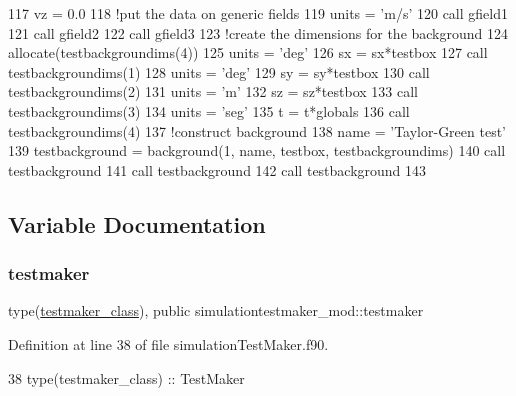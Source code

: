 \begin{DoxyCode}
117     vz = 0.0
118     \textcolor{comment}{!put the data on generic fields}
119     units = \textcolor{stringliteral}{'m/s'}
120     \textcolor{keyword}{call }gfield1%
121     \textcolor{keyword}{call }gfield2%
122     \textcolor{keyword}{call }gfield3%
123     \textcolor{comment}{!create the dimensions for the background}
124     \textcolor{keyword}{allocate}(testbackgroundims(4))
125     units = \textcolor{stringliteral}{'deg'}
126     sx = sx*testbox%
127     \textcolor{keyword}{call }testbackgroundims(1)%
128     units = \textcolor{stringliteral}{'deg'}
129     sy = sy*testbox%
130     \textcolor{keyword}{call }testbackgroundims(2)%
131     units = \textcolor{stringliteral}{'m'}
132     sz = sz*testbox%
133     \textcolor{keyword}{call }testbackgroundims(3)%
134     units = \textcolor{stringliteral}{'seg'}
135     t = t*globals%
136     \textcolor{keyword}{call }testbackgroundims(4)%
137     \textcolor{comment}{!construct background}
138     name = \textcolor{stringliteral}{'Taylor-Green test'}
139     testbackground = background(1, name, testbox, testbackgroundims)
140     \textcolor{keyword}{call }testbackground%
141     \textcolor{keyword}{call }testbackground%
142     \textcolor{keyword}{call }testbackground%
143 
\end{DoxyCode}


\subsection{Variable Documentation}
\mbox{\label{namespacesimulationtestmaker__mod_a344a43a231fc0e61e77875fa7ec95b12}} 
\subsubsection{\texorpdfstring{testmaker}{testmaker}}
{\footnotesize\ttfamily type(\mbox{\hyperlink{structsimulationtestmaker__mod_1_1testmaker__class}{testmaker\+\_\+class}}), public simulationtestmaker\+\_\+mod\+::testmaker}



Definition at line 38 of file simulation\+Test\+Maker.\+f90.


\begin{DoxyCode}
38     \textcolor{keywordtype}{type}(testmaker\_class) :: TestMaker
\end{DoxyCode}
